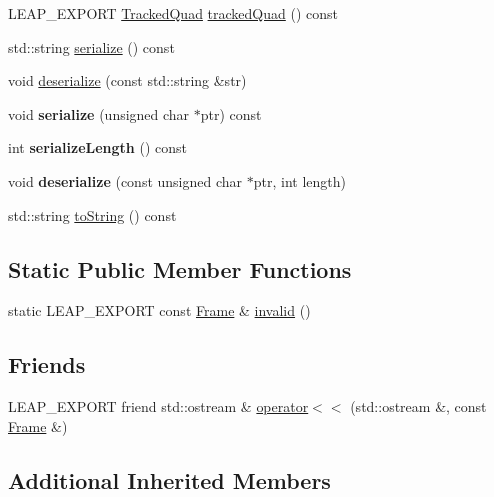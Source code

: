\begin{DoxyCompactItemize}
L\+E\+A\+P\+\_\+\+E\+X\+P\+O\+RT \hyperlink{class_leap_1_1_tracked_quad}{Tracked\+Quad} \hyperlink{class_leap_1_1_frame_ae49ca7a76631ddd2af748b7e27b766c4}{tracked\+Quad} () const
\item 
std\+::string \hyperlink{class_leap_1_1_frame_ad1620c4e860ce7568526afdf48a0a63b}{serialize} () const
\item 
void \hyperlink{class_leap_1_1_frame_ae9c75248baae66a299ac3a478cf8f9d7}{deserialize} (const std\+::string \&str)
\item 
\mbox{\label{class_leap_1_1_frame_a728b5a7573c4ef76678a54516f7a9724}} 
void {\bfseries serialize} (unsigned char $\ast$ptr) const
\item 
\mbox{\label{class_leap_1_1_frame_a5861538b589c8ed9a3f45d5d0d0bda35}} 
int {\bfseries serialize\+Length} () const
\item 
\mbox{\label{class_leap_1_1_frame_a98fdb8cd71b328ea76e32bda055cbbc5}} 
void {\bfseries deserialize} (const unsigned char $\ast$ptr, int length)
\item 
std\+::string \hyperlink{class_leap_1_1_frame_ad18e9898875818374462f5531cfcb7a1}{to\+String} () const
\end{DoxyCompactItemize}
\subsection*{Static Public Member Functions}
\begin{DoxyCompactItemize}
\item 
static L\+E\+A\+P\+\_\+\+E\+X\+P\+O\+RT const \hyperlink{class_leap_1_1_frame}{Frame} \& \hyperlink{class_leap_1_1_frame_a069854a98be43ae91a9f23058674d2eb}{invalid} ()
\end{DoxyCompactItemize}
\subsection*{Friends}
\begin{DoxyCompactItemize}
\item 
L\+E\+A\+P\+\_\+\+E\+X\+P\+O\+RT friend std\+::ostream \& \hyperlink{class_leap_1_1_frame_a3eb142cc11b68e23a4aaa42c7784c6d2}{operator$<$$<$} (std\+::ostream \&, const \hyperlink{class_leap_1_1_frame}{Frame} \&)
\end{DoxyCompactItemize}
\subsection*{Additional Inherited Members}


